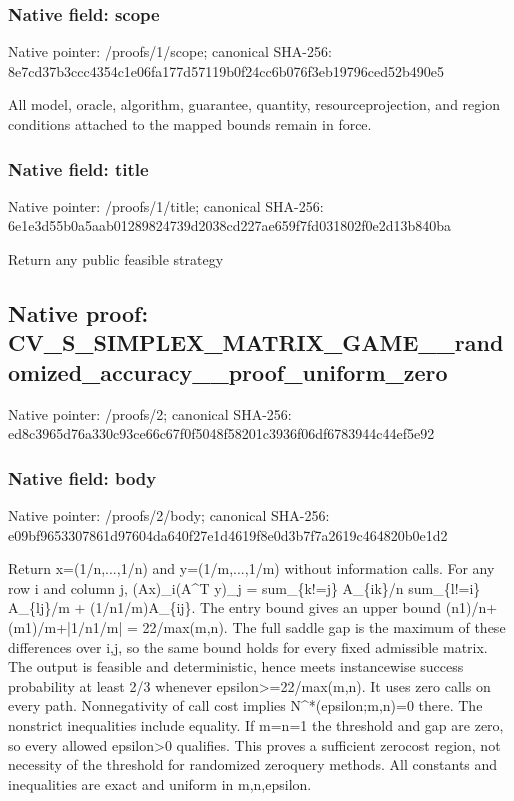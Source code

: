 \documentclass[10pt,a4paper]{article}
\begin{document}
\subsubsection{Native field: scope}


Native pointer: /proofs/1/scope; canonical SHA-256: 8e7cd37b3ccc4354c1e06fa1\allowbreak{}77d57119b0f24cc6b076f3eb\allowbreak{}19796ced52b490e5


All model, oracle, algorithm, guarantee, quantity, resourceprojection, and region conditions attached to the mapped bounds remain in force.


\subsubsection{Native field: title}


Native pointer: /proofs/1/title; canonical SHA-256: 6e1e3d55b0a5aab012898247\allowbreak{}39d2038cd227ae659f7fd031\allowbreak{}802f0e2d13b840ba


Return any public feasible strategy


\subsection{Native proof: CV\_S\_SIMPLEX\_MATRIX\_GAME\allowbreak{}\_\_randomized\_accuracy\_\_p\allowbreak{}roof\_uniform\_zero}


Native pointer: /proofs/2; canonical SHA-256: ed8c3965d76a330c93ce66c6\allowbreak{}7f0f5048f58201c3936f06df\allowbreak{}6783944c44ef5e92



\subsubsection{Native field: body}


Native pointer: /proofs/2/body; canonical SHA-256: e09bf9653307861d97604da6\allowbreak{}40f27e1d4619f8e0d3b7f7a2\allowbreak{}619c464820b0e1d2


Return x=(1/n,...,1/n) and y=(1/m,...,1/m) without information calls. For any row i and column j, (Ax)\_i(A\textasciicircum{}T y)\_j = sum\_\{k!=j\} A\_\{ik\}/n  sum\_\{l!=i\} A\_\{lj\}/m + (1/n1/m)A\_\{ij\}. The entry bound gives an upper bound (n1)/n+(m1)/m+|1/n1/m| = 22/max(m,n). The full saddle gap is the maximum of these differences over i,j, so the same bound holds for every fixed admissible matrix. The output is feasible and deterministic, hence meets instancewise success probability at least 2/3 whenever epsilon>=22/max(m,n). It uses zero calls on every path. Nonnegativity of call cost implies N\textasciicircum{}*(epsilon;m,n)=0 there. The nonstrict inequalities include equality. If m=n=1 the threshold and gap are zero, so every allowed epsilon>0 qualifies. This proves a sufficient zerocost region, not necessity of the threshold for randomized zeroquery methods. All constants and inequalities are exact and uniform in m,n,epsilon.
\end{document}

